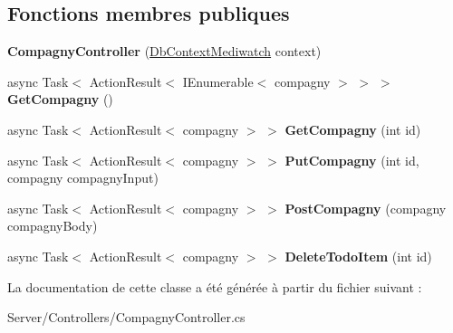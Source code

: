 \subsection*{Fonctions membres publiques}
\begin{DoxyCompactItemize}
\item 
\mbox{\label{class_mediwatch_1_1_server_1_1_controllers_1_1_compagny_controller_ab4a8837fdb737884b3248ee77f734ad0}} 
{\bfseries Compagny\+Controller} (\hyperlink{class_server_1_1_db_context_mediwatch}{Db\+Context\+Mediwatch} context)
\item 
\mbox{\label{class_mediwatch_1_1_server_1_1_controllers_1_1_compagny_controller_a7bc69ceda49f9017a2d6ddfdbffe4758}} 
async Task$<$ Action\+Result$<$ I\+Enumerable$<$ compagny $>$ $>$ $>$ {\bfseries Get\+Compagny} ()
\item 
\mbox{\label{class_mediwatch_1_1_server_1_1_controllers_1_1_compagny_controller_a6608c7128f9e7b31b04885ef1d7e004d}} 
async Task$<$ Action\+Result$<$ compagny $>$ $>$ {\bfseries Get\+Compagny} (int id)
\item 
\mbox{\label{class_mediwatch_1_1_server_1_1_controllers_1_1_compagny_controller_a6d092dd8d9edcd60e4a38e1d90af3e40}} 
async Task$<$ Action\+Result$<$ compagny $>$ $>$ {\bfseries Put\+Compagny} (int id, compagny compagny\+Input)
\item 
\mbox{\label{class_mediwatch_1_1_server_1_1_controllers_1_1_compagny_controller_ad144f627b336f3e43ba994fbdd9c9419}} 
async Task$<$ Action\+Result$<$ compagny $>$ $>$ {\bfseries Post\+Compagny} (compagny compagny\+Body)
\item 
\mbox{\label{class_mediwatch_1_1_server_1_1_controllers_1_1_compagny_controller_a5c33b6687ecca9c5b060f029ce809e7d}} 
async Task$<$ Action\+Result$<$ compagny $>$ $>$ {\bfseries Delete\+Todo\+Item} (int id)
\end{DoxyCompactItemize}


La documentation de cette classe a été générée à partir du fichier suivant \+:\begin{DoxyCompactItemize}
\item 
Server/\+Controllers/Compagny\+Controller.\+cs\end{DoxyCompactItemize}
